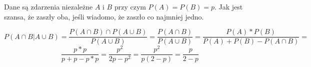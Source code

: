 \documentclass[11pt,makeidx, a4paper]{memoir}
\begin{document}
Dane są zdarzenia niezależne $A$ i $B$ przy czym $P(A) = P(B) = p$. Jak jest szansa, że zaszły oba, jeśli wiadomo, że zaszło co najmniej jedno.


$$
P(A \cap B | A \cup B ) =  \frac {P(A \cap B ) \cap P ( A \cup B)} { P ( A \cup B)} = 
\frac {P(A \cap B )} { P ( A \cup B)} =  
\frac {P(A) * P (B)} {P(A) + P (B) - P ( A \cap B)} = 
$$
$$
\frac {p * p} {p + p - p * p} = \frac {p ^ {2} }{2p - p ^{2}} = 
\frac {p ^{2}} {p( 2 - p) } = 
\frac {p} { 2 - p } 
$$
\end{document}
